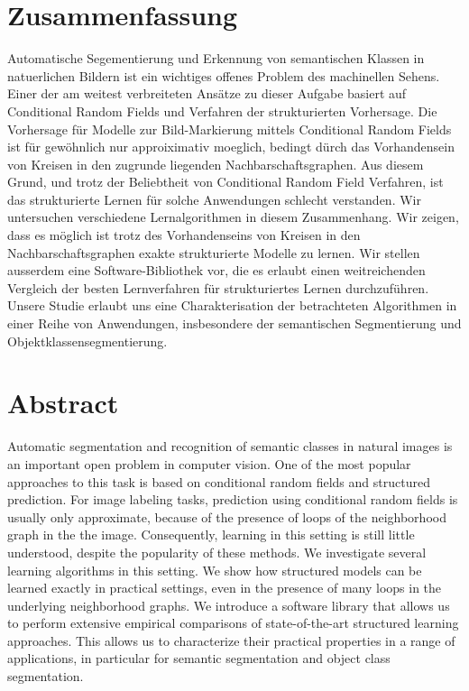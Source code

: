 \documentclass[12pt,toc=bibnumbered, a4paper,twoside,DIV=11]{scrbook}
\begin{document}
\chapter*{Zusammenfassung}
Automatische Segementierung und Erkennung von semantischen Klassen in
natuerlichen Bildern ist ein wichtiges offenes Problem des machinellen Sehens.
Einer der am weitest verbreiteten Ans\"atze zu dieser Aufgabe basiert auf
Conditional Random Fields und Verfahren der strukturierten Vorhersage. Die
Vorhersage f\"ur Modelle zur Bild-Markierung mittels Conditional Random Fields
ist f\"ur gew\"ohnlich nur approiximativ moeglich, bedingt d\"urch das
Vorhandensein von Kreisen in den zugrunde liegenden Nachbarschaftsgraphen.
Aus diesem Grund, und trotz der Beliebtheit von Conditional Random Field
Verfahren, ist das strukturierte Lernen f\"ur solche Anwendungen schlecht
verstanden.
%
Wir untersuchen verschiedene Lernalgorithmen in diesem
Zusammenhang. Wir zeigen, dass es m\"oglich ist trotz des Vorhandenseins von
Kreisen in den Nachbarschaftsgraphen exakte strukturierte Modelle zu lernen.
Wir stellen ausserdem eine Software-Bibliothek vor, die es erlaubt einen
weitreichenden Vergleich der besten Lernverfahren f\"ur strukturiertes Lernen
durchzuf\"uhren.
Unsere Studie erlaubt uns eine Charakterisation der betrachteten Algorithmen
in einer Reihe von Anwendungen, insbesondere der semantischen Segmentierung und
Objektklassensegmentierung.

\chapter*{Abstract}
Automatic segmentation and recognition of semantic classes in natural images is an important open problem in computer vision.
One of the most popular approaches to this task is based on conditional random fields and structured prediction.
For image labeling tasks, prediction using conditional random fields is usually only approximate, because of the presence
of loops of the neighborhood graph in the the image. Consequently, learning in
this setting is still little understood, despite the popularity of these
methods.
%
We investigate several learning algorithms in this setting. We show
how structured models can be learned exactly in practical settings, even in the
presence of many loops in the underlying neighborhood graphs.  We introduce a
software library that allows us to perform extensive empirical comparisons of
state-of-the-art structured learning approaches. This allows us to characterize
their practical properties in a range of applications, in particular for semantic segmentation
and object class segmentation.
\end{document}
